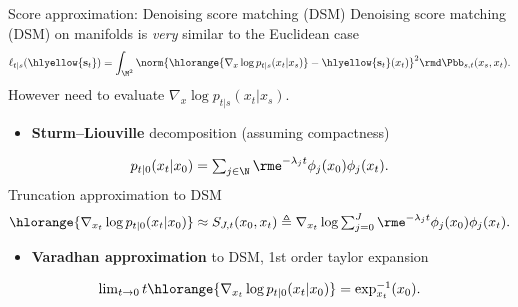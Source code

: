    
   \begin{frame}{Score approximation: Denoising score matching (DSM)}
       Denoising score matching (DSM) on manifolds is \textit{very} similar to the Euclidean case
       \begin{equation}
           \ell_{t|s}(\hlyellow{\mathbf{s}_t}) = \int_{\M^2} \norm{\hlorange{\nabla_x \log p_{t|s}(x_t|x_s)} -
             \hlyellow{\mathbf{s}_t}(x_t)}^2 \rmd \Pbb_{s,t}(x_s,x_t).
       \end{equation}
       However need to evaluate $\nabla_x \log p_{t|s}(x_t|x_s)$. %
       \pause
       \vspace{-\topsep}
       \begin{itemize} [triangle]
           \item \textbf{Sturm--Liouville} decomposition \cite{chavel1984eigenvalues} (assuming compactness)
       \end{itemize}
       \begin{equation}
           \label{eq:infinite_sum1}
           \textstyle{p_{t|0}(x_t|x_0) = \sum_{j \in \N} \rme^{-\lambda_j t} \phi_j(x_0)\phi_j(x_t).}
       \end{equation}
       Truncation approximation to DSM 
       \begin{equation} 
           \label{eq:heat_kernel_trunc}
           \hlorange{ \nabla_{x_t} \log p_{t|0}(x_t|x_0)} \approx \textstyle{S_{J,t}(x_0,x_t) \triangleq 
           \nabla_{x_t} \log {\sum_{j=0}^J  \rme^{-\lambda_j t} \phi_j(x_0)\phi_j(x_t)}
           . }
       \end{equation}
       \pause
       \vspace{-\topsep}
       \begin{itemize} [triangle]
           \item \textbf{Varadhan approximation} to DSM, 1st order taylor expansion
       \end{itemize}
       \begin{equation}
           \label{eq:varadhan}
           \textstyle{\lim_{t \to 0} t  \hlorange{\nabla_{x_t}\log p_{t|0}(x_t|x_0)} = \exp^{-1}_{x_t}(x_0) . }
       \end{equation}
   \end{frame}
   

